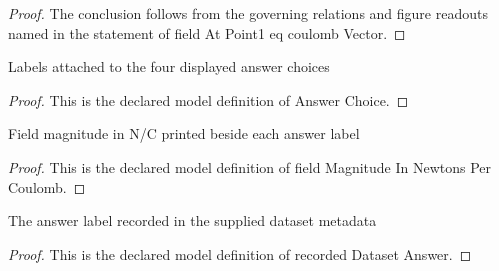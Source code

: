 \begin{proof}
  The conclusion follows from the governing relations and figure readouts named in the statement of field At Point1 eq coulomb Vector.
\end{proof}
\begin{definition}
  \label{def:physics:phyx-mini-0903:phyxminiproblems-problemphyxmini0903-answerchoice}
  Labels attached to the four displayed answer choices
\end{definition}
\begin{proof}
  This is the declared model definition of Answer Choice.
\end{proof}
\begin{definition}
  \label{def:physics:phyx-mini-0903:phyxminiproblems-problemphyxmini0903-answerchoice-fieldmagnitudeinnewtonspercoulomb}
  Field magnitude in N/C printed beside each answer label
\end{definition}
\begin{proof}
  This is the declared model definition of field Magnitude In Newtons Per Coulomb.
\end{proof}
\begin{definition}
  \label{def:physics:phyx-mini-0903:phyxminiproblems-problemphyxmini0903-recordeddatasetanswer}
  The answer label recorded in the supplied dataset metadata
\end{definition}
\begin{proof}
  This is the declared model definition of recorded Dataset Answer.
\end{proof}
